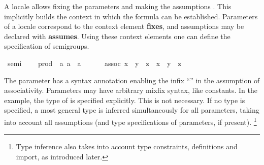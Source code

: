\begin{isabellebody}
\begin{isamarkuptext}
  A locale allows fixing the parameters  and making the assumptions .  This implicitly builds the context in
  which the formula  can be established.
  Parameters of a locale correspond to the context element
  \textbf{fixes}, and assumptions may be declared with
  \textbf{assumes}.  Using these context elements one can define
  the specification of semigroups.%
\end{isamarkuptext}%
\isamarkuptrue%
\isamarkupfalse%
\ semi\ {\isacharequal}\isanewline
\ \ \ prod\ {\isacharcolon}{\isacharcolon}\ {\isachardoublequoteopen}{\isacharbrackleft}{\isacharprime}a{\isacharcomma}\ {\isacharprime}a{\isacharbrackright}\ {\isasymRightarrow}\ {\isacharprime}a{\isachardoublequoteclose}\ {\isacharparenleft}\ {\isachardoublequoteopen}{\isasymcdot}{\isachardoublequoteclose}\ {}{}{\isacharparenright}\isanewline
\ \ \ assoc{\isacharcolon}\ {\isachardoublequoteopen}{\isacharparenleft}x\ {\isasymcdot}\ y{\isacharparenright}\ {\isasymcdot}\ z\ {\isacharequal}\ x\ {\isasymcdot}\ {\isacharparenleft}y\ {\isasymcdot}\ z{\isacharparenright}{\isachardoublequoteclose}%
\begin{isamarkuptext}%
The parameter  has a
  syntax annotation enabling the infix ``\isa{{\isasymcdot}}'' in the
  assumption of associativity.  Parameters may have arbitrary mixfix
  syntax, like constants.  In the example, the type of  is
  specified explicitly.  This is not necessary.  If no type is
  specified, a most general type is inferred simultaneously for all
  parameters, taking into account all assumptions (and type
  specifications of parameters, if present).%
\footnote{Type inference also takes into account type constraints,
  definitions and import, as introduced later.}


\end{isamarkuptext}
\end{isabellebody}
